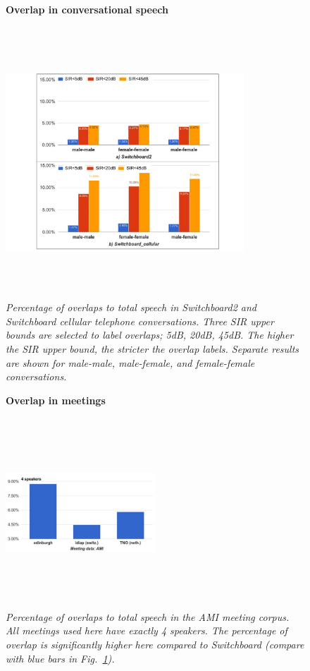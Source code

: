 \begin{figure}[t!]
	\centering
	\vspace{0mm}
	\textbf{Overlap in conversational speech}\par\medskip
	\includegraphics[height = 4in, width=0.8\textwidth]{figures/swb_overlap_percentage-crop}
	\vspace{-1mm}
	\caption{\it \small Percentage of overlaps to total speech in Switchboard2 and Switchboard cellular telephone conversations. Three SIR upper bounds are selected to label overlaps; 5dB, 20dB, 45dB. The higher the SIR upper bound, the stricter the overlap labels. Separate results are shown for male-male, male-female, and female-female conversations.}
	\label{fig:swb_overlap_percentage}
	\vspace{-3mm}
\end{figure}


\begin{figure}[b!]
	\vspace{0mm}
	\centering
	\textbf{Overlap in meetings}\par\medskip
	\includegraphics[height = 2.8in, width=0.5\textwidth]{figures/ami_overlap_percentage-crop}
	\vspace{-3mm}
	\caption{\it \small Percentage of overlaps to total speech in the AMI meeting corpus. All meetings used here have exactly 4 speakers. 
	The percentage of overlap is significantly higher here compared to Switchboard (compare with blue bars in Fig.~\ref{fig:swb_overlap_percentage}).}
	\label{fig:ami_overlap_percentage}
	\vspace{-3mm}
\end{figure}


